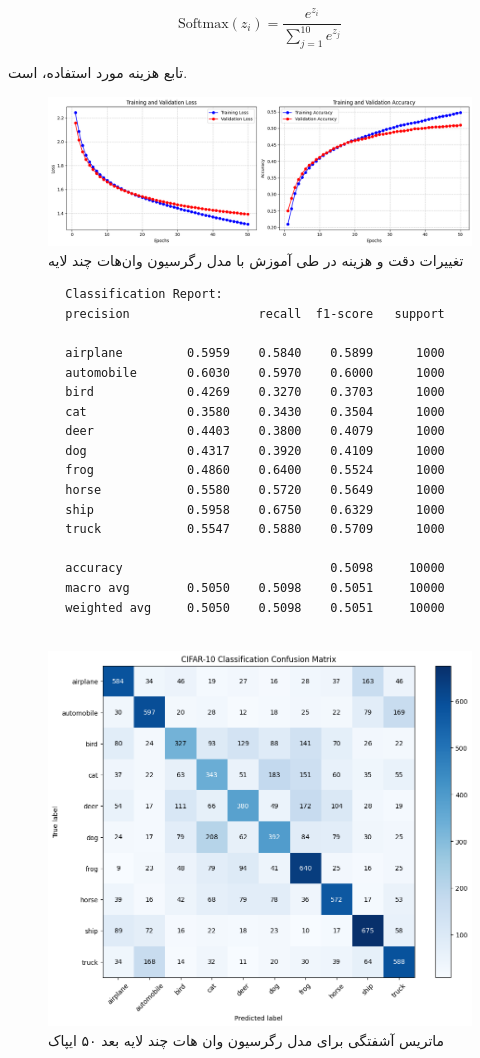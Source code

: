 	\[
	\text{Softmax}(z_i) = \frac{e^{z_i}}{\sum_{j=1}^{10} e^{z_j}}
	\]
	
	تابع هزینه مورد استفاده،  است.
	
		
	\begin{figure}[h]
		\centering
		\includegraphics[width=0.7\linewidth]{images/task3-1}
		\caption{تغییرات دقت و هزینه در طی آموزش با مدل رگرسیون وان‌هات چند لایه}
		\label{fig:task3-1}
	\end{figure}
	
	
	
	\begin{lstlisting}
		Classification Report:
		precision                  recall  f1-score   support
		
		airplane         0.5959    0.5840    0.5899      1000
		automobile       0.6030    0.5970    0.6000      1000
		bird             0.4269    0.3270    0.3703      1000
		cat              0.3580    0.3430    0.3504      1000
		deer             0.4403    0.3800    0.4079      1000
		dog              0.4317    0.3920    0.4109      1000
		frog             0.4860    0.6400    0.5524      1000
		horse            0.5580    0.5720    0.5649      1000
		ship             0.5958    0.6750    0.6329      1000
		truck            0.5547    0.5880    0.5709      1000
		
		accuracy                             0.5098     10000
		macro avg        0.5050    0.5098    0.5051     10000
		weighted avg     0.5050    0.5098    0.5051     10000
		
	\end{lstlisting}
	
	\begin{figure}[h]
		\centering
		\includegraphics[width=0.8\linewidth]{images/task3-2}
		\caption{ماتریس آشفتگی برای مدل رگرسیون وان هات چند لایه بعد ۵۰ ایپاک}
		\label{fig:task3-2}
	\end{figure}
	
